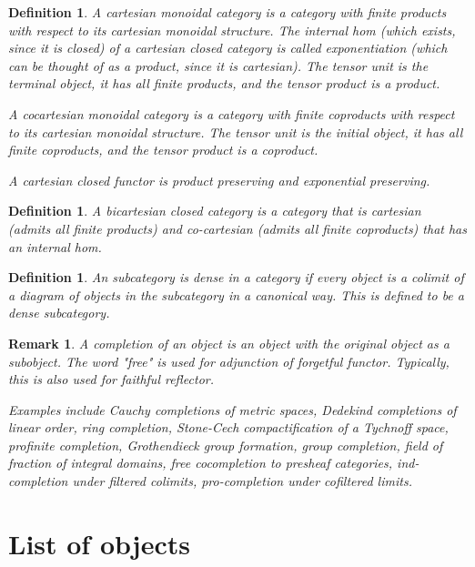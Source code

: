 \documentclass{tufte-book}
\newtheorem{definition}[theorem]{Definition}
\newtheorem{remark}[theorem]{Remark}
\begin{document}
 \begin{definition}
     A cartesian monoidal category is a category with finite products with respect to its cartesian monoidal structure. The internal hom (which exists, since it is closed) of a cartesian closed category is called exponentiation (which can be thought of as a product, since it is cartesian). The tensor unit is the terminal object, it has all finite products, and the tensor product is a product. 
 
     A cocartesian monoidal category is a category with finite coproducts with respect to its cartesian monoidal structure. The tensor unit is the initial object, it has all finite coproducts, and the tensor product is a coproduct. 
 
     A cartesian closed functor is product preserving and exponential preserving.
 \end{definition}
 
 \begin{definition}
     A bicartesian closed category is a category that is cartesian (admits all finite products) and co-cartesian (admits all finite coproducts) that has an internal hom.
 \end{definition}
 
 \begin{definition}
     An subcategory is dense in a category if every object is a colimit of a diagram of objects in the subcategory in a canonical way.
     This is defined to be a dense subcategory.
 \end{definition}
 
 \begin{remark}
     A completion of an object is an object with the original object as a subobject. The word "free" is used for adjunction of forgetful functor. Typically, this is also used for faithful reflector.
 
     Examples include Cauchy completions of metric spaces, Dedekind completions of linear order, ring completion, Stone-Cech compactification of a Tychnoff space, profinite completion, Grothendieck group formation, group completion, field of fraction of integral domains, free cocompletion to presheaf categories, ind-completion under filtered colimits, pro-completion under cofiltered limits.
 \end{remark}
 
 \section{List of objects}
 
\end{document}
